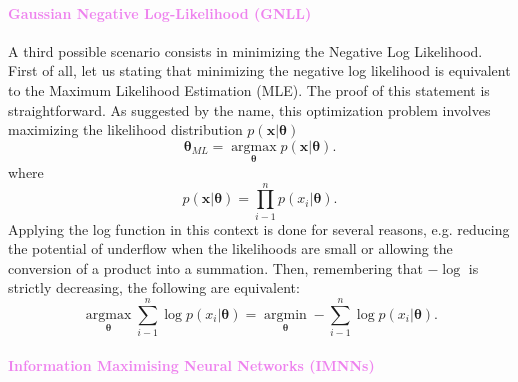 \documentclass{aa}
\begin{document}
\paragraph{\textcolor{violet}{Gaussian Negative Log-Likelihood (GNLL)}}
A third possible scenario consists in minimizing the Negative Log Likelihood. First of all, let us stating that minimizing the negative log likelihood is equivalent to the Maximum Likelihood Estimation (MLE). The proof of this statement is straightforward. As suggested by the name, this optimization problem involves maximizing the likelihood distribution $p(\bm{x}|\bm{\theta})$
\begin{equation}
    \bm{\theta}_{ML}= \operatorname*{argmax}_{\bm{\theta}}p(\bm{x}|\bm{\theta}).
\end{equation}
where
\begin{equation}
    p(\bm{x}|\bm{\theta})= \prod_{i-1}^n p(x_i|\bm{\theta}).
\end{equation}
Applying the log function in this context is done for several reasons, e.g. reducing the potential of underflow when the likelihoods are small or allowing the conversion of a product into a summation. 
Then, remembering that $-\log$ is strictly decreasing, the following are equivalent:
\begin{equation}
    \operatorname*{argmax}_{\bm{\theta}}\sum_{i-1}^n \log{p(x_i|\bm{\theta})}= \operatorname*{argmin}_{\bm{\theta}}-\sum_{i-1}^n \log{p(x_i|\bm{\theta})}.
\end{equation}

\paragraph{\textcolor{violet}{Information Maximising Neural Networks (IMNNs)}}
\end{document}

